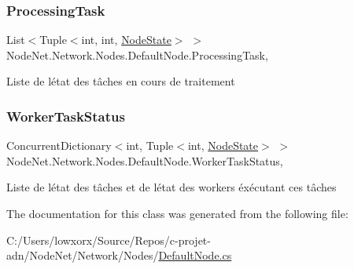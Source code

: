\subsubsection{\texorpdfstring{Processing\+Task}{ProcessingTask}}
{\footnotesize\ttfamily List$<$Tuple$<$int, int, \hyperlink{namespace_node_net_1_1_network_1_1_states_a0c130cd0043f8c509dddba2cf1fd2f36}{Node\+State}$>$ $>$ Node\+Net.\+Network.\+Nodes.\+Default\+Node.\+Processing\+Task\hspace{0.3cm}{\ttfamily [get]}, {\ttfamily [set]}}



Liste de l\textquotesingle{}état des tâches en cours de traitement 

\mbox{\label{class_node_net_1_1_network_1_1_nodes_1_1_default_node_a7c90a915b0464ab0cec6805ad275a66d}} 
\subsubsection{\texorpdfstring{Worker\+Task\+Status}{WorkerTaskStatus}}
{\footnotesize\ttfamily Concurrent\+Dictionary$<$int, Tuple$<$int, \hyperlink{namespace_node_net_1_1_network_1_1_states_a0c130cd0043f8c509dddba2cf1fd2f36}{Node\+State}$>$ $>$ Node\+Net.\+Network.\+Nodes.\+Default\+Node.\+Worker\+Task\+Status\hspace{0.3cm}{\ttfamily [get]}, {\ttfamily [set]}}



Liste de l\textquotesingle{}état des tâches et de l\textquotesingle{}état des workers éxécutant ces tâches 



The documentation for this class was generated from the following file\+:\begin{DoxyCompactItemize}
\item 
C\+:/\+Users/lowxorx/\+Source/\+Repos/c-\/projet-\/adn/\+Node\+Net/\+Network/\+Nodes/\hyperlink{_default_node_8cs}{Default\+Node.\+cs}\end{DoxyCompactItemize}
